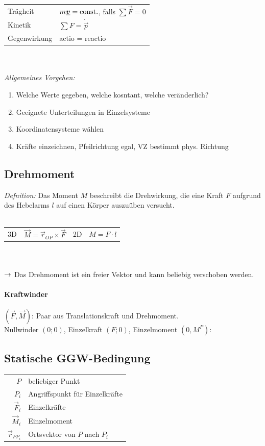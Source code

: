 \documentclass[fs, footer]{latex4ei}
\begin{document}
\begin{multicols}{4}
\begin{tabular}{ll}
	Trägheit & $m \underline{\boldsymbol {v}} = \operatorname{const.}$, falls $\sum \vec F = 0$\\
	Kinetik & $\sum F = \dot{ \vec p}$\\
	Gegenwirkung & actio = reactio\\
\end{tabular}\\
\\
\emph{Allgemeines Vorgehen:}
\begin{enumerate}\itemsep-2pt
	\item Welche Werte gegeben, welche kosntant, welche veränderlich?
	\item Geeignete Unterteilungen in Einzelsysteme
	\item Koordinatensysteme wählen
	\item Kräfte einzeichnen, Pfeilrichtung egal, VZ bestimmt phys. Richtung
\end{enumerate}
	
	\subsection{Drehmoment}
	\emph{Defnition:} Das Moment $M$ beschreibt die Drehwirkung, die eine Kraft $F$ aufgrund des Hebelarms $l$ auf einen Körper auszuüben versucht.\\ \\
	\begin{tabular}{ll|ll}
		3D  & $\vec M = \vec r_{OP} \times \vec F$ & 2D  &  $M = F \cdot l$ \\
	\end{tabular} \\ \\ 
	$\rightarrow$ Das Drehmoment ist ein freier Vektor und kann beliebig verschoben werden.\\
	\paragraph{Kraftwinder} $(\vec F,\vec M)$: Paar aus Translationskraft und Drehmoment.\\
	Nullwinder $(0;0)$, Einzelkraft $(F;0)$, Einzelmoment $(0,M^P):$ \\


	\subsection{Statische GGW-Bedingung}
	\begin{tabular}{rl}
		$P$ & beliebiger Punkt \\
		$P_i$ &  Angriffspunkt für Einzelkräfte \\
		$\vec F_i$ &  Einzelkräfte \\
		$	\vec M_i$ &  Einzelmoment \\ 
		$\vec r_{PP_i}$ & Ortsvektor von $P$ nach $P_i$\\
	\end{tabular} \\ 
	\\




\end{multicols}
\end{document}
